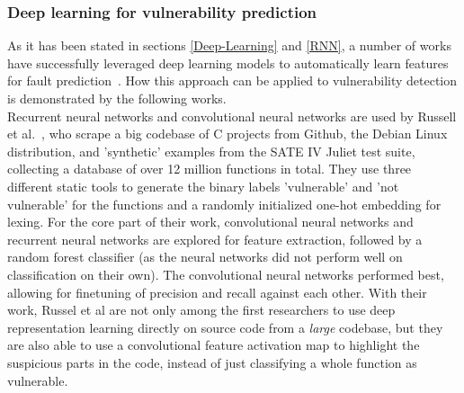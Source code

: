 \documentclass[
a4paper,
pagesize,
pdftex,
12pt,
ngerman,
fleqn,
final,
]{scrartcl}
\begin{document}
	\subsubsection{Deep learning for vulnerability prediction}\label{deep-vulnerability-prediction}
	As it has been stated in sections \ref{Deep-Learning} and \ref{RNN}, a number of works have successfully leveraged deep learning models to automatically learn features for fault prediction~\cite{IEEE.2015b,IEEE.2016,Wang.2016}. How this approach can be applied to vulnerability detection is demonstrated by the following works.\\
	Recurrent neural networks and convolutional neural networks are used by Russell et al.~\cite{Russell.2018}, who scrape a big codebase of C projects from Github, the Debian Linux distribution, and 'synthetic' examples from the SATE IV Juliet test suite, collecting a database of over 12 million functions in total. They use three different static tools to generate the binary labels 'vulnerable' and 'not vulnerable' for the functions and a randomly initialized one-hot embedding for lexing. For the core part of their work, convolutional neural networks and recurrent neural networks are explored for feature extraction, followed by a random forest classifier (as the neural networks did not perform well on classification on their own). The convolutional neural networks performed best, allowing for finetuning of precision and recall against each other. With their work, Russel et al are not only among the first researchers to use deep representation learning directly on source code from a \textit{large} codebase, but they are also able to use a convolutional feature activation map to highlight the suspicious parts in the code, instead of just classifying a whole function as vulnerable.\\
\end{document}
